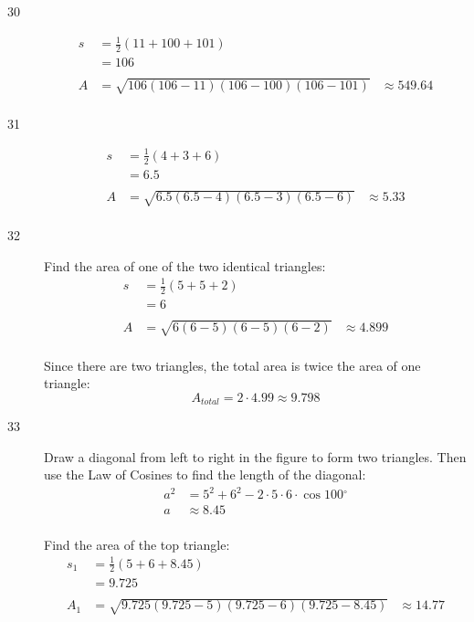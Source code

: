 \documentclass{exam}
\newcommand{\dg}{\ensuremath{^\circ}}
\begin{document}
\begin{description}
      \item[30]
        \begin{align*}
          s  & = \frac{1}{2}(11 + 100 + 101) \\
             & = 106 \\
          \\
          A  & = \sqrt{106 (106 - 11)(106 - 100) (106 - 101)}
             & \approx \boxed{ 549.64 } \\
        \end{align*}

      \item[31]
        \begin{align*}
          s  & = \frac{1}{2}(4 + 3 + 6) \\
             & = 6.5 \\
          \\
          A  & = \sqrt{6.5 (6.5 - 4)(6.5 - 3) (6.5 - 6)}
             & \approx \boxed{ 5.33 } \\
        \end{align*}

      \item[32]
        Find the area of one of the two identical triangles:
        \begin{align*}
          s  & = \frac{1}{2}(5 + 5 + 2) \\
             & = 6 \\
          \\
          A  & = \sqrt{6 (6 - 5)(6 - 5) (6 - 2)}
             & \approx 4.899 \\
        \end{align*}

        Since there are two triangles, the total area is twice the area of one triangle: 
        \[
          A_{total} = 2 \cdot 4.99 \approx \boxed{ 9.798 }
        \]

      \item[33]
        Draw a diagonal from left to right in the figure to form two triangles.  Then use the Law of Cosines to find the
        length of the diagonal:
        \begin{align*}
          a^2 & = 5^2 + 6^2 - 2 \cdot 5 \cdot 6 \cdot \cos 100 \dg \\
          a   & \approx 8.45 \\
        \end{align*}

        Find the area of the top triangle:
        \begin{align*}
          s_1 & = \frac{1}{2}(5 + 6 + 8.45) \\
              & = 9.725 \\
          \\
          A_1 & = \sqrt{9.725 (9.725 - 5)(9.725 - 6) (9.725 - 8.45)}
              & \approx \boxed{ 14.77 } \\
        \end{align*}


\end{description}
\end{document}
